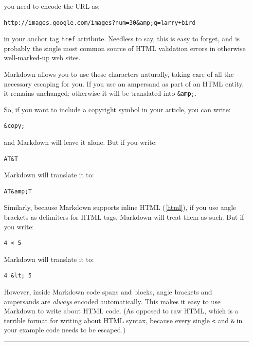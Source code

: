 you need to encode the URL as:

\begin{verbatim}
http://images.google.com/images?num=30&amp;q=larry+bird
\end{verbatim}

in your anchor tag \texttt{href} attribute. Needless to say, this is easy to
forget, and is probably the single most common source of HTML validation
errors in otherwise well-marked-up web sites.

Markdown allows you to use these characters naturally, taking care of
all the necessary escaping for you. If you use an ampersand as part of
an HTML entity, it remains unchanged; otherwise it will be translated
into \texttt{\&amp;}.

So, if you want to include a copyright symbol in your article, you can write:

\begin{verbatim}
&copy;
\end{verbatim}

and Markdown will leave it alone. But if you write:

\begin{verbatim}
AT&T
\end{verbatim}

Markdown will translate it to:

\begin{verbatim}
AT&amp;T
\end{verbatim}

Similarly, because Markdown supports inline HTML (\autoref{html}), if you use
angle brackets as delimiters for HTML tags, Markdown will treat them as
such. But if you write:

\begin{verbatim}
4 < 5
\end{verbatim}

Markdown will translate it to:

\begin{verbatim}
4 &lt; 5
\end{verbatim}

However, inside Markdown code spans and blocks, angle brackets and
ampersands are \emph{always} encoded automatically. This makes it easy to use
Markdown to write about HTML code. (As opposed to raw HTML, which is a
terrible format for writing about HTML syntax, because every single \texttt{<}
and \texttt{\&} in your example code needs to be escaped.)

\begin{center}\rule{3in}{0.4pt}\end{center}

